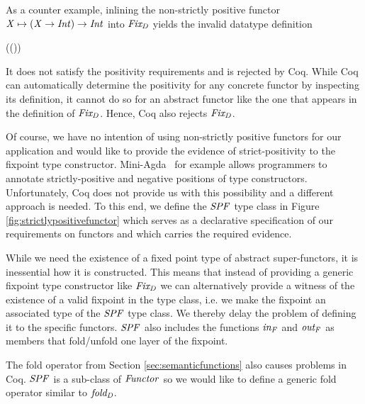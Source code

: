 As a counter example, inlining the non-strictly positive functor \ensuremath{\Conid{X}\mapsto(\Conid{X}\to \Conid{Int})\to \Conid{Int}} into \ensuremath{\Varid{Fix_{D}}} yields the invalid datatype
definition
\begin{hscode}\SaveRestoreHook
{}%
%
%
\>[3]{}\;\mathrel{=}\;((\to {})\to {}){}\<[E]%
\ColumnHook
\end{hscode}\resethooks
It does not satisfy the positivity requirements and is rejected by
Coq. While Coq can automatically determine the positivity for any
concrete functor by inspecting its definition, it cannot do so for an
abstract functor like the one that appears in the definition of
\ensuremath{\Varid{Fix_{D}}}. Hence, Coq also rejects \ensuremath{\Varid{Fix_{D}}}.

Of course, we have no intention of using non-strictly positive
functors for our application and would like to provide the evidence of
strict-positivity to the fixpoint type
constructor. Mini-Agda~\cite{miniagda} for example allows programmers
to annotate strictly-positive and negative positions of type
constructors. Unfortunately, Coq does not provide us with this
possibility and a different approach is needed. To this end, we define
the \ensuremath{\Conid{SPF}} type class in Figure \ref{fig:strictlypositivefunctor} which
serves as a declarative specification of our requirements on functors
and which carries the required evidence.

While we need the existence of a fixed point type of abstract
super-functors, it is inessential how it is constructed. This means
that instead of providing a generic fixpoint type constructor like
\ensuremath{\Varid{Fix_{D}}} we can alternatively provide a witness of the existence of a
valid fixpoint in the type class, i.e. we make the fixpoint an
associated type of the \ensuremath{\Conid{SPF}} type class.  We thereby delay the problem
of defining it to the specific functors. \ensuremath{\Conid{SPF}} also includes the
functions \ensuremath{\Varid{in_{F}}} and \ensuremath{\Varid{out_{F}}} as members that fold/unfold one layer
of the fixpoint.

The fold operator from Section \ref{sec:semanticfunctions} also causes
problems in Coq. \ensuremath{\Conid{SPF}} is a sub-class of \ensuremath{\Conid{Functor}} so we would like to
define a generic fold operator similar to \ensuremath{\Varid{fold_{D}}}.

